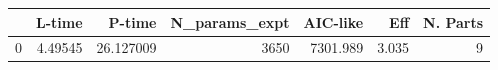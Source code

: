 \begin{tabular}{lrrrrrr}
\toprule
{} &   L-time &     P-time &  N\_params\_expt &  AIC-like &    Eff &  N. Parts \\
\midrule
0 &  4.49545 &  26.127009 &           3650 &  7301.989 &  3.035 &         9 \\
\bottomrule
\end{tabular}
